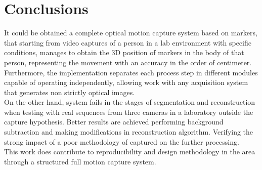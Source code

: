 \section{Conclusions}

It could be obtained a complete optical motion capture system based on markers,
that starting from video captures of a person in a lab environment with specific conditions, manages to obtain the 3D position of markers in the body of that person, representing the movement with an accuracy in the order of centimeter.\\
\hspace*{0.5cm} Furthermore, the implementation separates each process step in different modules capable of operating independently, allowing work with any acquisition system that generates non strictly optical images.\\
\hspace*{0.5cm} On the other hand, system fails in the stages of segmentation and reconstruction when testing with real sequences from three cameras in a laboratory outside the capture hypothesis. Better results are achieved performing background subtraction and making modifications in reconstruction algorithm. Verifying the strong impact of a poor methodology of captured on the further processing.\\
\hspace*{0.5cm}This work does contribute to reproducibility and design methodology in the area through a structured full motion capture system.
